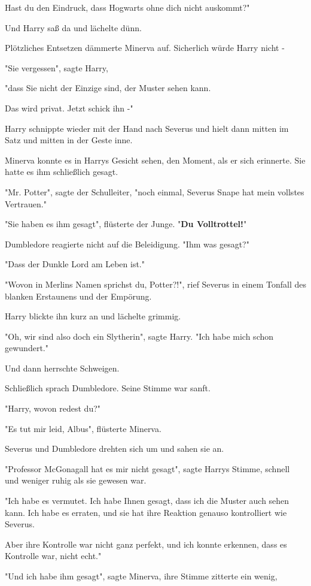 {Hast du den Eindruck, dass Hogwarts ohne dich nicht auskommt?"

Und Harry saß da und lächelte dünn.

Plötzliches Entsetzen dämmerte Minerva auf. Sicherlich würde Harry nicht -

"Sie vergessen", sagte Harry,

"dass Sie nicht der Einzige sind, der Muster sehen kann.

Das wird privat. Jetzt schick ihn -"

Harry schnippte wieder mit der Hand nach Severus und hielt dann mitten im Satz und mitten in der Geste inne.

Minerva konnte es in Harrys Gesicht sehen, den Moment, als er sich erinnerte. Sie hatte es ihm schließlich gesagt.

"Mr. Potter", sagte der Schulleiter, "noch einmal, Severus Snape hat mein vollstes Vertrauen."

"Sie haben es ihm gesagt", flüsterte der Junge. "\textbf{Du Volltrottel!}"

Dumbledore reagierte nicht auf die Beleidigung. "Ihm was gesagt?"

"Dass der Dunkle Lord am Leben ist."

"Wovon in Merlins Namen sprichst du, Potter?!", rief Severus in einem Tonfall des blanken Erstaunens und der Empörung.

Harry blickte ihn kurz an und lächelte grimmig.

"Oh, wir sind also doch ein Slytherin", sagte Harry. "Ich habe mich schon gewundert."

Und dann herrschte Schweigen.

Schließlich sprach Dumbledore. Seine Stimme war sanft.

"Harry, wovon redest du?"

"Es tut mir leid, Albus", flüsterte Minerva.

Severus und Dumbledore drehten sich um und sahen sie an.

"Professor McGonagall hat es mir nicht gesagt", sagte Harrys Stimme, schnell und weniger ruhig als sie gewesen war.

"Ich habe es vermutet. Ich habe Ihnen gesagt, dass ich die Muster auch sehen kann. Ich habe es erraten, und sie hat ihre Reaktion genauso kontrolliert wie Severus.

Aber ihre Kontrolle war nicht ganz perfekt, und ich konnte erkennen, dass es Kontrolle war, nicht echt."

"Und ich habe ihm gesagt", sagte Minerva, ihre Stimme zitterte ein wenig,

}
